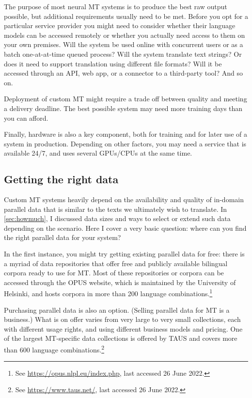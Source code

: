 \documentclass[output=paper]{langscibook}
\begin{document}
The purpose of most neural MT systems is to produce the best raw output possible, but additional requirements usually need to be met. Before you opt for a particular service provider you might need to consider whether their language models can be accessed remotely or whether you actually need access to them on your own premises. Will the system be used online with concurrent users or as a batch one-at-at-time queued process? Will the system translate text strings? Or does it need to support translation using different file formats? Will it be accessed through an API, web app, or a connector to a third-party tool? And so on.

Deployment of custom MT might require a trade off between quality and meeting a delivery deadline.  The best possible system may need more training days than you can afford. 

Finally, hardware is also a key component, both for training and for later use of a system in production. Depending on other factors, you may need a service that is available 24/7, and uses several GPUs/CPUs at the same time.

\subsection{Getting the right data}\largerpage

Custom MT systems heavily depend on the availability and quality of in-domain parallel data that is similar to the texts we ultimately wish to translate. In \ref{sec:howmuch}, I discussed data sizes and ways to select or extend such data depending on the scenario. Here I cover a very basic question: where can you find the right parallel data for your system? 

In the first instance, you might try getting existing parallel data for free: there is a myriad of data repositories that offer free and publicly available bilingual corpora ready to use for MT. Most of these repositories or corpora can be accessed through the OPUS website, which is maintained by the University of Helsinki, and hosts corpora in more than 200 language combinations.\footnote{See \url{https://opus.nlpl.eu/index.php}, last accessed 26 June 2022.}

Purchasing parallel data is also an option. (Selling parallel data for MT is a business.) What is on offer varies from very large to very small collections, each with different usage rights, and using different business models and pricing. One of the largest MT-specific data collections is offered by TAUS and covers more than 600 language combinations.\footnote{See \url{https://www.taus.net/}, last accessed 26 June 2022.} 
\end{document}

